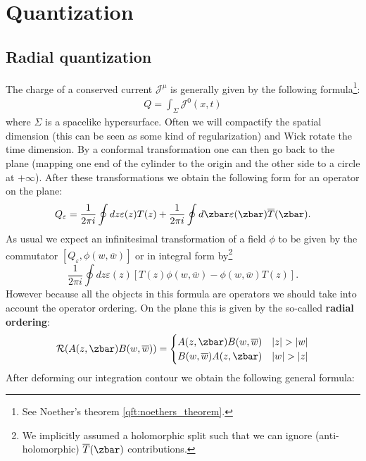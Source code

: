 \section{Quantization}


\subsection{Radial quantization}

	The charge of a conserved current $\mathcal{J}^\mu$ is generally given by the following formula\footnote{See Noether's theorem \ref{qft:noethers_theorem}.}:
	\begin{gather}
		Q = \int_\Sigma\mathcal{J}^0(x, t)
	\end{gather}
	where $\Sigma$ is a spacelike hypersurface. Often we will compactify the spatial dimension (this can be seen as some kind of regularization) and Wick rotate the time dimension. By a conformal transformation one can then go back to the plane (mapping one end of the cylinder to the origin and the other side to a circle at $+\infty$). After these transformations we obtain the following form for an operator on the plane:
	\begin{gather}
		Q_\varepsilon = \frac{1}{2\pi i}\oint dz\varepsilon(z)T(z) + \frac{1}{2\pi i}\oint d\zbar\varepsilon(\zbar)\overline{T}(\zbar).
	\end{gather}
	As usual we expect an infinitesimal transformation of a field $\phi$ to be given by the commutator $[Q_\varepsilon, \phi(w, \overline{w})]$ or in integral form by\footnote{We implicitly assumed a holomorphic split such that we can ignore (anti-holomorphic) $\overline{T}(\zbar)$ contributions.} \[\frac{1}{2\pi i}\oint dz\varepsilon(z)[T(z)\phi(w, \overline{w}) - \phi(w, \overline{w})T(z)].\] However because all the objects in this formula are operators we should take into account the operator ordering. On the plane this is given by the so-called \textbf{radial ordering}:
	\begin{gather}
		\mathcal{R}(A(z, \zbar)B(w, \overline{w})) = \begin{cases}
			A(z, \zbar)B(w, \overline{w})&|z|>|w|\\
			B(w, \overline{w})A(z, \zbar)&|w|>|z|
		\end{cases}
	\end{gather}
	After deforming our integration contour we obtain the following general formula:
